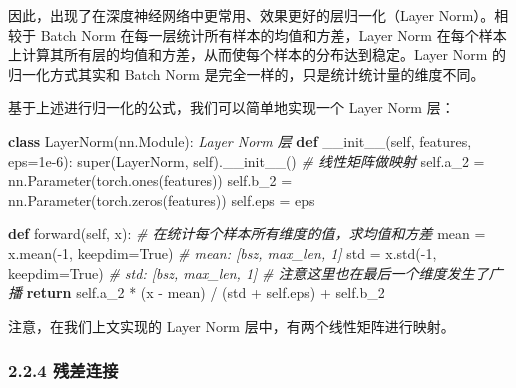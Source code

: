 \documentclass[
]{article}
\newenvironment{Shaded}{}{}
\newcommand{\BuiltInTok}[1]{\textcolor[rgb]{0.00,0.50,0.00}{#1}}
\newcommand{\CommentTok}[1]{\textcolor[rgb]{0.38,0.63,0.69}{\textit{#1}}}
\newcommand{\ControlFlowTok}[1]{\textcolor[rgb]{0.00,0.44,0.13}{\textbf{#1}}}
\newcommand{\DecValTok}[1]{\textcolor[rgb]{0.25,0.63,0.44}{#1}}
\newcommand{\FloatTok}[1]{\textcolor[rgb]{0.25,0.63,0.44}{#1}}
\newcommand{\FunctionTok}[1]{\textcolor[rgb]{0.02,0.16,0.49}{#1}}
\newcommand{\KeywordTok}[1]{\textcolor[rgb]{0.00,0.44,0.13}{\textbf{#1}}}
\newcommand{\NormalTok}[1]{#1}
\newcommand{\OperatorTok}[1]{\textcolor[rgb]{0.40,0.40,0.40}{#1}}
\newcommand{\VariableTok}[1]{\textcolor[rgb]{0.10,0.09,0.49}{#1}}
\begin{document}
因此，出现了在深度神经网络中更常用、效果更好的层归一化（Layer
Norm）。相较于 Batch Norm 在每一层统计所有样本的均值和方差，Layer Norm
在每个样本上计算其所有层的均值和方差，从而使每个样本的分布达到稳定。Layer
Norm 的归一化方式其实和 Batch Norm
是完全一样的，只是统计统计量的维度不同。

基于上述进行归一化的公式，我们可以简单地实现一个 Layer Norm 层：

\begin{Shaded}
\begin{Highlighting}[]
\KeywordTok{class}\NormalTok{ LayerNorm(nn.Module):}
    \CommentTok{\textquotesingle{}\textquotesingle{}\textquotesingle{} Layer Norm 层\textquotesingle{}\textquotesingle{}\textquotesingle{}}
    \KeywordTok{def} \FunctionTok{\_\_init\_\_}\NormalTok{(}\VariableTok{self}\NormalTok{, features, eps}\OperatorTok{=}\FloatTok{1e{-}6}\NormalTok{):}
    \BuiltInTok{super}\NormalTok{(LayerNorm, }\VariableTok{self}\NormalTok{).}\FunctionTok{\_\_init\_\_}\NormalTok{()}
    \CommentTok{\# 线性矩阵做映射}
    \VariableTok{self}\NormalTok{.a\_2 }\OperatorTok{=}\NormalTok{ nn.Parameter(torch.ones(features))}
    \VariableTok{self}\NormalTok{.b\_2 }\OperatorTok{=}\NormalTok{ nn.Parameter(torch.zeros(features))}
    \VariableTok{self}\NormalTok{.eps }\OperatorTok{=}\NormalTok{ eps}
    
    \KeywordTok{def}\NormalTok{ forward(}\VariableTok{self}\NormalTok{, x):}
    \CommentTok{\# 在统计每个样本所有维度的值，求均值和方差}
\NormalTok{    mean }\OperatorTok{=}\NormalTok{ x.mean(}\OperatorTok{{-}}\DecValTok{1}\NormalTok{, keepdim}\OperatorTok{=}\VariableTok{True}\NormalTok{) }\CommentTok{\# mean: [bsz, max\_len, 1]}
\NormalTok{    std }\OperatorTok{=}\NormalTok{ x.std(}\OperatorTok{{-}}\DecValTok{1}\NormalTok{, keepdim}\OperatorTok{=}\VariableTok{True}\NormalTok{) }\CommentTok{\# std: [bsz, max\_len, 1]}
    \CommentTok{\# 注意这里也在最后一个维度发生了广播}
    \ControlFlowTok{return} \VariableTok{self}\NormalTok{.a\_2 }\OperatorTok{*}\NormalTok{ (x }\OperatorTok{{-}}\NormalTok{ mean) }\OperatorTok{/}\NormalTok{ (std }\OperatorTok{+} \VariableTok{self}\NormalTok{.eps) }\OperatorTok{+} \VariableTok{self}\NormalTok{.b\_2}
\end{Highlighting}
\end{Shaded}

注意，在我们上文实现的 Layer Norm 层中，有两个线性矩阵进行映射。

\subsubsection{2.2.4 残差连接}\label{ux6b8bux5deeux8fdeux63a5}
\end{document}
